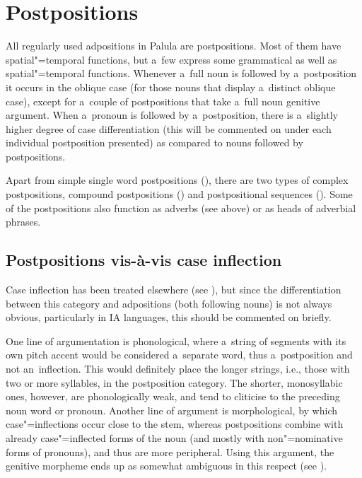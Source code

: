 \section{Postpositions}
\label{sec:7-2}

All regularly used adpositions in Palula are postpositions. Most of them have spatial"=temporal functions, but a~few express some grammatical as well as spatial"=temporal functions. Whenever a~full noun is followed by a~postposition it occurs in the oblique case (for those nouns that display a~distinct oblique case), except for a~couple of postpositions that take a~full noun genitive argument. When a~pronoun is followed by a~postposition, there is a~slightly higher degree of case differentiation (this will be commented on under each individual postposition presented) as compared to nouns followed by postpositions.


Apart from simple single word postpositions (), there are two types of complex postpositions, compound postpositions () and postpositional sequences (). Some of the postpositions also function as adverbs (see above) or as heads of adverbial phrases. 


\subsection{Postpositions vis-à-vis case inflection}
\label{subsec:7-2-1}


Case inflection has been treated elsewhere (see ), but since the differentiation between this category and adpositions (both following nouns) is not always obvious, particularly in IA languages, this should be commented on briefly. 


One line of argumentation is phonological, where a~string of segments with its own pitch accent would be considered a~separate word, thus a~postposition and not an~inflection. This would definitely place the longer strings, i.e., those with two or more syllables, in the postposition category. The shorter, monosyllabic ones, however, are phonologically weak, and tend to cliticise to the preceding noun word or pronoun. Another line of argument is morphological, by which case"=inflections occur close to the stem, whereas postpositions combine with already case"=inflected forms of the noun (and mostly with non"=nominative forms of pronouns), and thus are more peripheral. Using this argument, the genitive morpheme ends up as somewhat ambiguous in this respect (see ).


